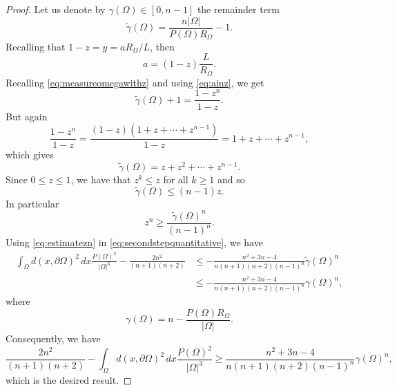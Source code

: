 \documentclass[oneside,a4paper,11pt,notitlepage]{article}
\newcommand{\abs}[1]{{\left|#1\right|}}
\theoremstyle{definition}
\theoremstyle{plain}
\theoremstyle{definition}
\begin{document}
\begin{proof}
Let us denote by $\gamma(\Omega) \in [0,n-1]$ the remainder term
\begin{equation*}
    \tilde \gamma(\Omega)= \frac{n\abs{\Omega}}{P(\Omega)R_\Omega}-1.
\end{equation*}
Recalling that $1-z= y= aR_\Omega/L$, then
\begin{equation}\label{eq:ainz}
    a = (1-z)\frac{L}{R_\Omega}.
\end{equation}
Recalling \eqref{eq:measureomegawithz} and using \eqref{eq:ainz}, we get
\begin{equation*}
    \tilde \gamma(\Omega)+1 = \frac{1-z^n}{1-z}.
\end{equation*}
But again
\begin{equation*}
   \frac{1-z^n}{1-z}= \frac{(1-z)(1+z+\cdots +z^{n-1})}{1-z}= 1+z+\cdots +z^{n-1},
\end{equation*}
which gives
\begin{equation*}
    \tilde \gamma(\Omega) = z+z^2+\cdots+z^{n-1}.
\end{equation*}
Since $0\le z \le 1$, we have that $z^k\le z$ for all $k\ge 1$ and so
\begin{equation*}
    \tilde \gamma(\Omega)\le (n-1)z. 
\end{equation*}
In particular
\begin{equation}\label{eq:estimatezn}
    z^n \ge \frac{ \tilde \gamma(\Omega)^n}{(n-1)^n}.
\end{equation}
Using \eqref{eq:estimatezn} in \eqref{eq:secondstepquantitative}, we have
\begin{equation*}
\begin{aligned}
    \int_{\Omega} d(x,\partial\Omega)^2\, dx\frac{P(\Omega)^2}{\abs{\Omega}^3}-\frac{2n^2}{(n+1)(n+2)}&\le -\frac{n^2+3n-4}{n(n+1)(n+2)(n-1)^{n}}\tilde \gamma(\Omega)^n \\&\leq -\frac{n^2+3n-4}{n(n+1)(n+2)(n-1)^{n}} \gamma(\Omega)^n ,
\end{aligned}
\end{equation*}
where
$$\gamma(\Omega)= n - \frac{P(\Omega) R_{\Omega}}{\abs{\Omega}}.$$
Consequently, we have \begin{equation*}
   \frac{2n^2}{(n+1)(n+2)}-\int_{\Omega} d(x,\partial\Omega)^2\, dx\frac{P(\Omega)^2}{\abs{\Omega}^3}\ge \frac{n^2+3n-4}{n(n+1)(n+2)(n-1)^{n}}\gamma(\Omega)^n, 
\end{equation*}
which is the desired result.


\end{proof}
\end{document}
